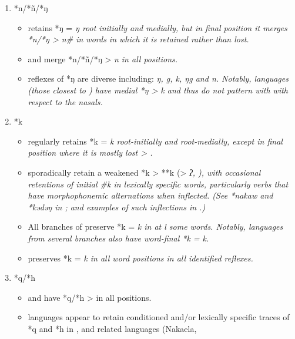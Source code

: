 \begin{enumerate}
	\item	*n/*ñ/*ŋ
		\begin{itemize}[topsep=0pt,leftmargin=\dimexpr 15pt-6pt]
			\item	{} retains *ŋ = \it{ŋ} root initially
						and medially, but in final position it merges *n/*ŋ > \it{n}{\#}
						in words in which it is retained rather than lost.
			\item	{}
						and  merge *n/*ñ/*ŋ > \it{n} in all positions.
			\item	{} reflexes of *ŋ are diverse including:
						\it{ŋ, g, k, ŋg} and \it{n}.
						Notably,  languages (those closest to )
						have medial *ŋ > \it{k}
						and thus do not pattern with  with respect to the nasals.
		\end{itemize}
	\item	*k
		\begin{itemize}[topsep=0pt,leftmargin=\dimexpr 15pt-6pt]
			\item	{} regularly retains *k = \it{k} root-initially
						and root-medially, except in final position where it is mostly lost > {\0}.
			\item	{} sporadically retain a weakened *k > **k (>
						\it{ʔ}, {\0}), with occasional retentions of initial {\#}\it{k} in lexically
						specific words, particularly verbs that have morphophonemic alternations when inflected.
						(See *nakaw and *kədəŋ in ;
						and examples of such inflections in .)
			\item	All branches of  preserve *k =
						\it{k} in at l some words.
						Notably, languages from several branches also have word-final *k = \it{k}.
			\item	{} preserves *k = \it{k} in all word positions in all identified reflexes.
		\end{itemize}
	\item	*q/*h
		\begin{itemize}[topsep=0pt,leftmargin=\dimexpr 15pt-6pt]
			\item	{}
						and  have *q/*h > {\0} in all positions.
			\item	{} languages appear to retain conditioned and/or
						lexically specific traces of *q
						and *h in ,
						 and related languages (Naka{\Q}ela,

\end{itemize}
\end{enumerate}

